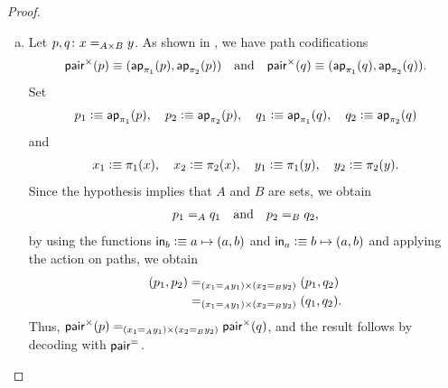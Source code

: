\begin{proof}
\begin{enumerate}[a),font=\upshape]
        For the inductive step, we assume the hypothesis $h\colon E(n)$ for a given $n\colon\N$. We must construct a term of type
        \[
            E(\fun{succ}(n))\equiv
            \prod_{y\colon\N}\;\prod_{c,d\colon\fun{Code}(\fun{succ}(n),y)}
                c\eq{\fun{Code}(\fun{succ}(n),y)}d.
        \]
        We proceed by induction on $y$ with the motive
        \[
            E_{\fun{succ}(n)}(y)
                \defeq\prod_{c,d\colon\fun{Code}(\fun{succ}(n),y)}
                    c\eq{\fun{Code}(\fun{succ}(n),y)}d.
        \]
        
        \begin{enumerate}[-]
            \item If $y\equiv0$, then $\fun{Code}(\fun{succ}(n),0)\equiv\fun0$. As before, applying the induction principle of the empty type to $c\colon\fun0$ trivially yields the required path.
            
            \item If $y\equiv\fun{succ}(m)$, then $\fun{Code}(\fun{succ}(n),\fun{succ}(m))\equiv\fun{Code}(n,m)$. Then, $h(m)(c,d)$ yields the required path of type $c\eq{\fun{Code}(n,m)}d$.
        \end{enumerate}

        \item Let $p,q\colon x\eq{A\times B}y$. As shown in , we have path codifications
        \[
            \mathsf{pair}^\times(p)
                \equiv(\mathsf{ap}_{\pi_1}(p),\mathsf{ap}_{\pi_2}(p))
            \quad\text{and}\quad
            \mathsf{pair}^\times(q)
                \equiv(\mathsf{ap}_{\pi_1}(q),\mathsf{ap}_{\pi_2}(q)).
        \]
        Set
        \[
            p_1\mathrel{\vcentcolon}\equiv\mathsf{ap}_{\pi_1}(p),\quad
            p_2\mathrel{\vcentcolon}\equiv\mathsf{ap}_{\pi_2}(p),\quad
            q_1\mathrel{\vcentcolon}\equiv\mathsf{ap}_{\pi_1}(q),\quad
            q_2\mathrel{\vcentcolon}\equiv\mathsf{ap}_{\pi_2}(q)
        \]
        and
        \[
            x_1\mathrel{\vcentcolon}\equiv\pi_1(x),\quad x_2\mathrel{\vcentcolon}\equiv\pi_2(x),\quad
            y_1\mathrel{\vcentcolon}\equiv\pi_1(y),\quad y_2\mathrel{\vcentcolon}\equiv\pi_2(y).
        \]
        Since the hypothesis implies that $A$ and $B$ are sets, we obtain
        \[
            p_1\mathrel{=_{A}}q_1
            \quad\text{and}\quad
            p_2\mathrel{=_{B}}q_2,
        \]
        by using the functions $\mathsf{in}_b\mathrel{\vcentcolon}\equiv a\mapsto(a,b)$ and $\mathsf{in}_a\mathrel{\vcentcolon}\equiv b\mapsto(a,b)$ and applying the action on paths, we obtain
        \begin{align*}
            (p_1,p_2)
                &\mathrel{=_{(x_1\mathrel{=_{A}}y_1)\times(x_2\mathrel{=_{B}}y_2)}}
                    (p_1,q_2)\\
                &\mathrel{=_{(x_1\mathrel{=_{A}}y_1)\times(x_2\mathrel{=_{B}}y_2)}}
                    (q_1,q_2).
        \end{align*}
        Thus, $\mathsf{pair}^\times(p)\mathrel{=_{(x_1\mathrel{=_{A}}y_1)\times(x_2\mathrel{=_{B}}y_2)}}\mathsf{pair}^\times(q)$, and the result follows by decoding with $\mathsf{pair}^{\mathrel{=_{}}}$.
        

\end{enumerate}
\end{proof}
